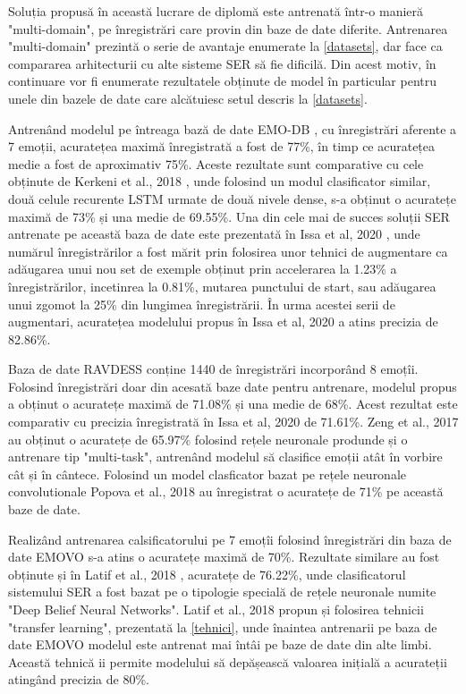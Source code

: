 \documentclass[a4paper,12pt]{book}
\begin{document}
		 Soluția propusă în această lucrare de diplomă este antrenată într-o manieră "multi-domain", pe înregistrări care provin din baze de date diferite. Antrenarea "multi-domain" prezintă o serie de avantaje enumerate la \ref{datasets}, dar face ca compararea arhitecturii cu alte sisteme SER să fie dificilă. Din acest motiv, în continuare vor fi enumerate rezultatele obținute de model în particular pentru unele din bazele de date care alcătuiesc setul descris la \ref{datasets}. \par
		 Antrenând modelul pe întreaga bază de date EMO-DB \cite{emodb}, cu înregistrări aferente a 7 emoții, acuratețea maximă înregistrată a fost de 77\%, în timp ce acuratețea medie a fost de aproximativ 75\%. Aceste rezultate sunt comparative cu cele obținute de Kerkeni et al., 2018 \cite{comp1}, unde folosind un modul clasificator similar, două celule recurente LSTM urmate de două nivele dense, s-a obținut o acuratețe maximă de 73\% și una medie de 69.55\%. Una din cele mai de succes soluții SER antrenate pe această baza de date este prezentată în Issa et al, 2020 \cite{comp2}, unde numărul înregistrărilor a fost mărit prin folosirea unor tehnici de augmentare ca adăugarea unui nou set de exemple obținut prin accelerarea la 1.23\% a înregistrărilor, incetinrea la 0.81\%, mutarea punctului de start, sau adăugarea unui zgomot la 25\% din lungimea înregistrării. În urma acestei serii de augmentari, acuratețea modelului propus în Issa et al, 2020 \cite{comp2} a atins precizia de 82.86\%.\par
		 Baza de date RAVDESS \cite{ravdess} conține 1440 de înregistrări incorporând 8 emoțîi. Folosind înregistrări doar din acesată baze date pentru antrenare, modelul propus a obținut o acuratețe maximă de 71.08\% și una medie de 68\%. Acest rezultat este comparativ cu precizia înregistrată în Issa et al, 2020 \cite{comp2} de 71.61\%. Zeng et al., 2017 \cite{comp3} au obținut o acuratețe de 65.97\% folosind rețele neuronale produnde și o antrenare tip "multi-task", antrenând modelul să clasifice emoții atât în vorbire cât și în cântece. Folosind un model clasficator bazat pe rețele neuronale convolutionale Popova et al., 2018 \cite{comp4} au înregistrat o acuratețe de 71\% pe această baze de date. \par
		 Realizând antrenarea calsificatorului pe 7 emoțîi folosind înregistrări din baza de date EMOVO \cite{emovo} s-a atins o acuratețe maximă de 70\%. Rezultate similare au fost obținute și în Latif et al., 2018 \cite{comp5}, acuratețe de 76.22\%, unde clasificatorul sistemului SER a fost bazat pe o tipologie specială de rețele neuronale numite "Deep Belief Neural Networks". Latif et al., 2018 \cite{comp5} propun și folosirea tehnicii "transfer learning", prezentată la \ref{tehnici}, unde înaintea antrenarii pe baza de date EMOVO modelul este antrenat mai întâi pe baze de date din alte limbi. Această tehnică ii permite modelului să depășească valoarea inițială a acurateții atingând precizia de 80\%. \par 
\end{document}
